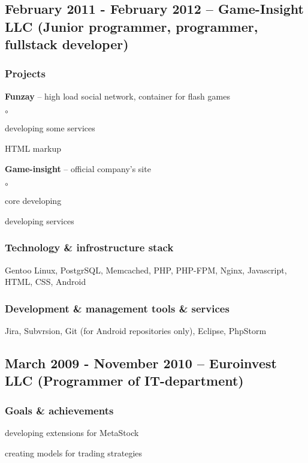 \documentclass[9pt, a4paper, english]{extarticle}
\begin{document}
  \subsection* {February 2011 - February 2012 -- \textbf{Game-Insight LLC} (Junior programmer, programmer, fullstack developer)}
    \subsubsection* {Projects}
      \begin {list}{\textbullet}{\itemsep=0mm}
        \item \textbf{Funzay} -- high load social network, container for flash games
          \begin {list}{$\circ$}{}
            \item developing some services
            \item HTML markup 
          \end {list} 
        \item \textbf{Game-insight} -- official company's site
          \begin {list}{$\circ$}{}
            \item core developing
            \item developing services
          \end {list}
      \end {list}
    \subsubsection* {Technology \& infrostructure stack}
      Gentoo Linux, PostgrSQL, Memcached, PHP, PHP-FPM, Nginx, Javascript,
      HTML, CSS, Android
    \subsubsection* {Development \& management tools \& services}
      Jira, Subvrsion, Git (for Android repositories only), Eclipse, PhpStorm


  \subsection* {March 2009 - November 2010 -- \textbf{Euroinvest LLC} (Programmer of IT-department)}
    \subsubsection* {Goals \& achievements}
      \begin {list}{\textbullet}{\itemsep=0mm}
        \item developing extensions for MetaStock
        \item creating models for trading strategies
      \end {list}
\end{document}
